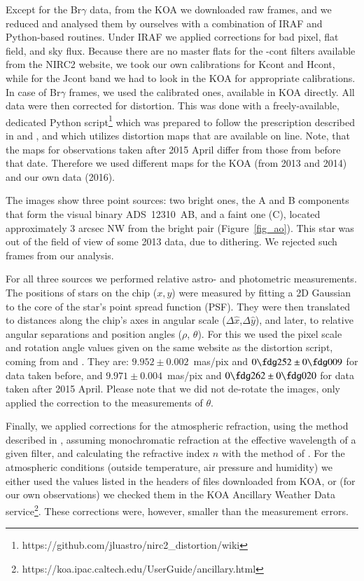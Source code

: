 \documentclass{aa}
\begin{document}
Except for the Br$\gamma$ data, from the KOA we downloaded raw frames, and we
reduced and analysed them by ourselves with a combination of IRAF and Python-based routines. 
Under IRAF we applied corrections for bad pixel, flat field, and sky flux.
Because there are no master flats for the -cont filters available from the NIRC2 website, 
we took our own calibrations for Kcont and Hcont, while for the Jcont band we had to look 
in the KOA for appropriate calibrations. In case of Br$\gamma$ frames, we used
the calibrated ones, available in KOA directly. All data were then corrected for
distortion. This was done with a freely-available, dedicated Python 
script\footnote{https://github.com/jluastro/nirc2\_distortion/wiki} 
which was prepared to follow the prescription described in \citet{yel10}
and \citet{ser16}, and which utilizes distortion maps that are available on line. 
Note, that the maps for observations taken after 2015 April differ from those 
from before that date. Therefore we used different
maps for the KOA (from 2013 and 2014) and our own data (2016).

The images show three point sources: two bright ones, the A and B components
that form the visual binary ADS~12310~AB, and a faint one (C), located 
approximately 3 arcsec NW from the bright pair (Figure~\ref{fig_ao}). This
star was out of the field of view of some 2013 data, due to dithering.
We rejected such frames from our analysis.

For all three sources we performed relative astro- and photometric measurements. 
The positions of stars on the chip ($x,y$) were measured by fitting a 2D Gaussian
to the core of the star's point spread function (PSF). They were then translated to 
distances along the chip's axes in angular scale ($\Delta \hat{x}$,$\Delta \hat{y}$), 
and later, to relative angular separations and position angles ($\rho$, $\theta$). 
For this we used the pixel scale and rotation angle values given on the same website 
as the distortion script, coming from \citet{yel10} and \citet{ser16}. They are:
$9.952\pm0.002$~mas/pix and $0\fdg252\pm0\fdg009$ for data taken before, and
$9.971\pm0.004$~mas/pix and $0\fdg262\pm0\fdg020$ for data taken after 2015 April. 
Please note that we did not de-rotate the images, only applied the correction to
the measurements of $\theta$.

Finally, we applied corrections for the atmospheric refraction, using the method described 
in \citet{hel09a}, assuming monochromatic refraction at the effective wavelength of a 
given filter, and calculating the refractive index $n$ with the method of \citet{mat04,mat07}. 
For the atmospheric conditions (outside temperature, air pressure and humidity) we
either used the values listed in the headers of files downloaded from KOA, or
(for our own observations) we checked them in the KOA Ancillary Weather Data 
service\footnote{https://koa.ipac.caltech.edu/UserGuide/ancillary.html}. These corrections
were, however, smaller than the measurement errors.
\end{document}
